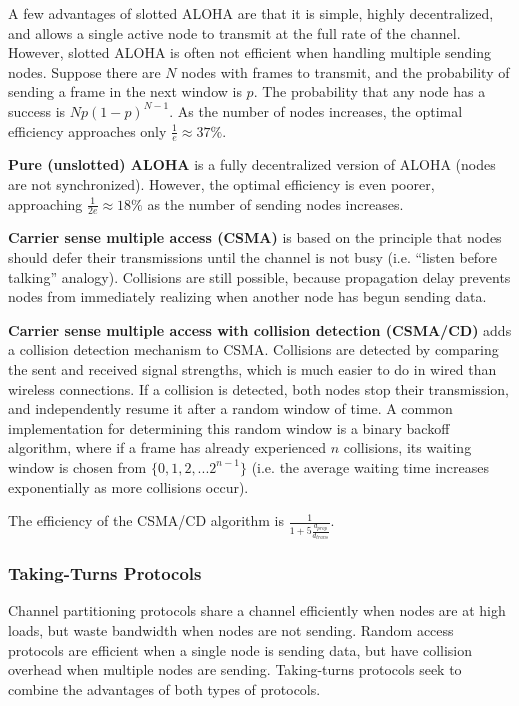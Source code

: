 \documentclass[12pt,titlepage]{article}
\begin{document}
        A few advantages of slotted ALOHA are that it is simple, highly decentralized, and allows a single active node to transmit at the full rate of the channel.
        However, slotted ALOHA is often not efficient when handling multiple sending nodes. Suppose there are $N$ nodes with frames to transmit, and the probability
        of sending a frame in the next window is $p$. The probability that any node has a success is $Np(1-p)^{N-1}$. As the number of nodes increases, the
        optimal efficiency approaches only $\frac{1}{e} \approx 37\%$.

        \textbf{Pure (unslotted) ALOHA} is a fully decentralized version of ALOHA (nodes are not synchronized). However, the optimal efficiency is even poorer,
        approaching $\frac{1}{2e} \approx 18\%$ as the number of sending nodes increases.

        \textbf{Carrier sense multiple access (CSMA)} is based on the principle that nodes should defer their transmissions until the channel is not busy (i.e. ``listen
          before talking'' analogy). Collisions are still possible, because propagation delay prevents nodes from immediately realizing when another node has begun
          sending data.

        \textbf{Carrier sense multiple access with collision detection (CSMA/CD)} adds a collision detection mechanism to CSMA. Collisions are detected by comparing
          the sent and received signal strengths, which is much easier to do in wired than wireless connections. If a collision is detected, both nodes stop their
          transmission, and independently resume it after a random window of time. A common implementation for determining this random window is a binary backoff
          algorithm, where if a frame has already experienced $n$ collisions, its waiting window is chosen from $\{0, 1, 2, ... 2^{n-1}\}$ (i.e. the average waiting
          time increases exponentially as more collisions occur).

          The efficiency of the CSMA/CD algorithm is $\frac{1}{1 + 5\frac{d_{prop}}{d_{trans}}}$.

      \subsubsection{Taking-Turns Protocols}
        Channel partitioning protocols share a channel efficiently when nodes are at high loads, but waste bandwidth when nodes are not sending. Random access protocols
        are efficient when a single node is sending data, but have collision overhead when multiple nodes are sending. Taking-turns protocols seek to combine the
        advantages of both types of protocols.
\end{document}
